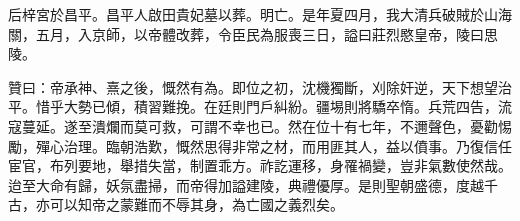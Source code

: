 \begin{pinyinscope}
后梓宮於昌平。昌平人啟田貴妃墓以葬。明亡。是年夏四月，我大清兵破賊於山海關，五月，入京師，以帝體改葬，令臣民為服喪三日，謚曰莊烈愍皇帝，陵曰思陵。

贊曰：帝承神、熹之後，慨然有為。即位之初，沈機獨斷，刈除奸逆，天下想望治平。惜乎大勢已傾，積習難挽。在廷則門戶糾紛。疆埸則將驕卒惰。兵荒四告，流寇蔓延。遂至潰爛而莫可救，可謂不幸也已。然在位十有七年，不邇聲色，憂勸惕勵，殫心治理。臨朝浩歎，慨然思得非常之材，而用匪其人，益以僨事。乃復信任宦官，布列要地，舉措失當，制置乖方。祚訖運移，身罹禍變，豈非氣數使然哉。迨至大命有歸，妖氛盡掃，而帝得加謚建陵，典禮優厚。是則聖朝盛德，度越千古，亦可以知帝之蒙難而不辱其身，為亡國之義烈矣。

\end{pinyinscope}